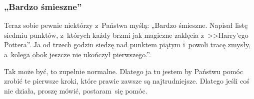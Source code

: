 \documentclass[10pt,t]{beamer}
\begin{document}
\begin{frame}
  \frametitle{„Bardzo śmieszne”}


  Teraz sobie pewnie niektórzy z~Państwa myślą: „Bardzo śmieszne. Napisał
  listę siedmiu punktów, z~których każdy brzmi jak magiczne zaklęcia
  z~>>Harry’ego Pottera”. Ja od trzech godzin siedzę nad punktem piątym
  i~powoli tracę zmysły, a~kolega obok jeszcze nie ukończył pierwszego.”.

  Tak może być, to zupełnie normalne. Dlatego ja tu jestem by Państwu pomóc
  zrobić te pierwsze kroki, które prawie zawsze są najtrudniejsze. Dlatego
  jeśli coś nie działa, proszę mówić, postaram~się pomóc.

\end{frame}
















































\end{document}
